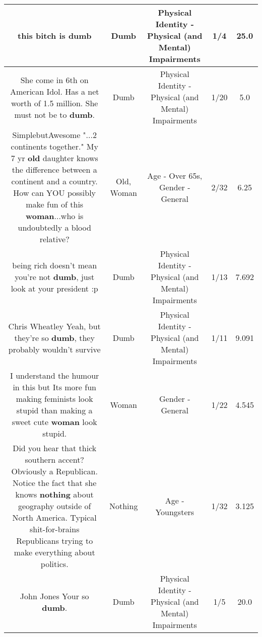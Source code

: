 \documentclass[11pt]{article}
\newlength\mylength
\begin{document}
\begin{center}
\begin{longtable}{|C{.65\mylength}|C{.30\mylength}|C{.12\mylength}|C{.12\mylength}|C{.12\mylength}|}
  \small this bitch is dumb\normalsize   & Dumb & Physical Identity - Physical (and Mental) Impairments & 1/4 & 25.0 \\  \hline
  \small She come in 6th on American Idol. Has a net worth of 1.5 million. She must not be to \textbf{dumb}.\normalsize   & Dumb & Physical Identity - Physical (and Mental) Impairments & 1/20 & 5.0 \\  \hline
  \small SimplebutAwesome   "...2 continents together." My 7 yr \textbf{old} daughter knows the difference between a continent and a country. How can YOU possibly make fun of this \textbf{woman}...who is undoubtedly a blood relative?\normalsize   & Old, Woman & Age - Over 65s, Gender - General & 2/32 & 6.25 \\  \hline
  \small being rich doesn't mean you're not \textbf{dumb}, just look at your president :p\normalsize   & Dumb & Physical Identity - Physical (and Mental) Impairments & 1/13 & 7.692 \\  \hline
  \small Chris Wheatley Yeah, but they're so \textbf{dumb}, they probably wouldn't survive\normalsize   & Dumb & Physical Identity - Physical (and Mental) Impairments & 1/11 & 9.091 \\  \hline
  \small I understand the humour in this but Its more fun making feminists look stupid than making a sweet cute \textbf{woman} look stupid.\normalsize   & Woman & Gender - General & 1/22 & 4.545 \\  \hline
  \small Did you hear that thick southern accent? Obviously a Republican. Notice the fact that she knows \textbf{nothing} about geography outside of North America. Typical shit-for-brains Republicans trying to make everything about politics.\normalsize   & Nothing & Age - Youngsters & 1/32 & 3.125 \\  \hline
  \small John Jones Your so \textbf{dumb}.\normalsize   & Dumb & Physical Identity - Physical (and Mental) Impairments & 1/5 & 20.0 \\  \hline

\end{longtable}
\end{center}
\end{document}
